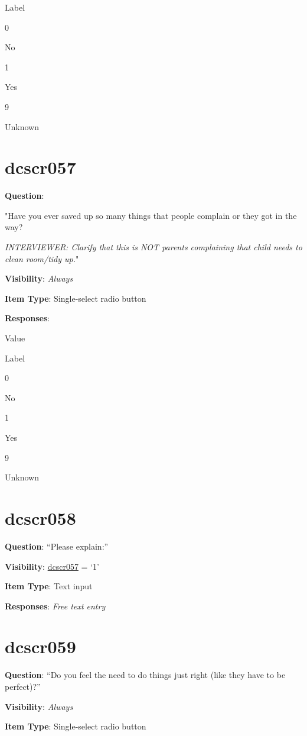 \documentclass[]{book}
\begin{document}
Label

0

No

1

Yes

9

Unknown

\hypertarget{dcscr057}{%
\section{dcscr057}\label{dcscr057}}

\textbf{Question}:

"Have you ever saved up so many things that people complain or they got in the way?

\emph{INTERVIEWER: Clarify that this is NOT parents complaining that child needs to clean room/tidy up.}"

\textbf{Visibility}: \emph{Always}

\textbf{Item Type}: Single-select radio button

\textbf{Responses}:

Value

Label

0

No

1

Yes

9

Unknown

\hypertarget{dcscr058}{%
\section{dcscr058}\label{dcscr058}}

\textbf{Question}: ``Please explain:''

\textbf{Visibility}: \protect\hyperlink{dcscr057}{dcscr057} = `1'

\textbf{Item Type}: Text input

\textbf{Responses}: \emph{Free text entry}

\hypertarget{dcscr059}{%
\section{dcscr059}\label{dcscr059}}

\textbf{Question}: ``Do you feel the need to do things just right (like they have to be perfect)?''

\textbf{Visibility}: \emph{Always}

\textbf{Item Type}: Single-select radio button
\end{document}
